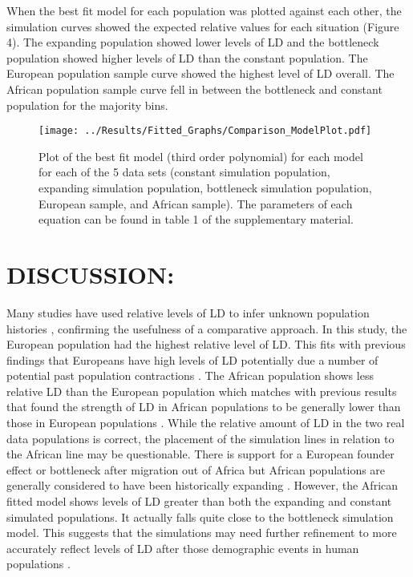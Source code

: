 \documentclass[11pt]{article}
\begin{document}
\begin{linenumbers}
When the best fit model for each population was plotted against each other, the simulation curves showed the expected relative values for each situation (Figure 4). The expanding population showed lower levels of LD and the bottleneck population showed higher levels of LD than the constant population. The European population sample curve showed the highest level of LD overall. The African population sample curve fell in between the bottleneck and constant population for the majority bins. 


\begin{figure}[htp]
\begin{center}
\texttt{[image: ../Results/Fitted\_Graphs/Comparison\_ModelPlot.pdf]}
\caption{\small Plot of the best fit model (third order polynomial) for each model for each of the 5 data sets (constant simulation population, expanding simulation population, bottleneck simulation population, European sample, and African sample). The parameters of each equation can be found in table 1 of the supplementary material.}
\end{center}
\end{figure}

\section{DISCUSSION:}

Many studies have used relative levels of LD to infer unknown population histories \citep{reich2001linkage,gray2009linkage}, confirming the usefulness of a comparative approach. In this study, the European population had the highest relative level of LD. This fits with previous findings that Europeans have high levels of LD potentially due a number of potential past population contractions \citep{reich2001linkage}. The African population shows less relative LD than the European population which matches with previous results that found the strength of LD in African populations to be generally lower than those in European populations \citep{reich2001linkage}. While the relative amount of LD in the two real data populations is correct, the placement of the simulation lines in relation to the African line may be questionable. There is support for a European founder effect or bottleneck after migration out of Africa \citep{reich2001linkage} but African populations are generally considered to have been historically expanding \citep{kruglyak1999prospects}. However, the African fitted model shows levels of LD greater than both the expanding and constant simulated populations. It actually falls quite close to the bottleneck simulation model. This suggests that the simulations may need further refinement to more accurately reflect levels of LD after those demographic events in human populations \citep{pritchard2001linkage}.      


\end{linenumbers}
\end{document}
